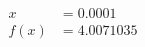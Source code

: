 \documentclass[preview]{standalone}
\begin{document}
\begin{align*}
x &= 0.0001\\f(x) &= 4.0071035
\end{align*}
\end{document}
